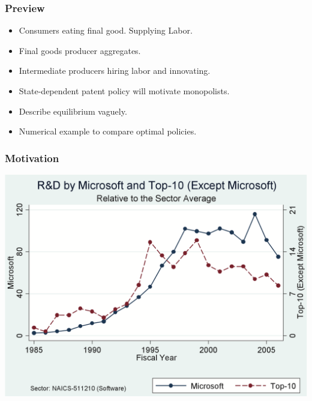 \documentclass{beamer}
\begin{document}
\begin{frame}[t]\frametitle{Preview}
    
\begin{itemize}
	\vspace{2mm}
  \item<+-> Consumers eating final good. Supplying Labor.
  \vspace{2mm}
  \item<+-> Final goods producer aggregates.
  \vspace{2mm}
  \item<+-> Intermediate producers hiring labor and innovating.
  \vspace{2mm}
  \item<+-> State-dependent patent policy will motivate monopolists.
  \vspace{2mm}
  \item<+-> Describe equilibrium vaguely.
  \vspace{2mm}
  \item<+-> Numerical example to compare optimal policies.
\end{itemize}
\end{frame}

\begin{frame}[t]\frametitle{Motivation}
    
\begin{center}
  \includegraphics[scale=.25]{microsoft_rd.png}
  \label{fig:}
\end{center}
\end{frame}
\end{document}

